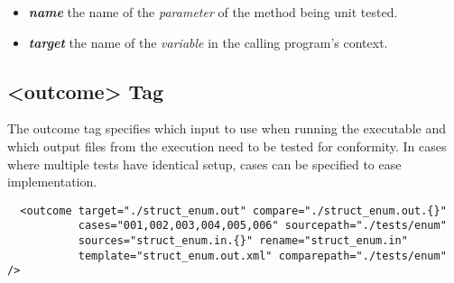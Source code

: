 \documentclass[paper=a4, fontsize=11pt]{scrartcl} %
\numberwithin{equation}{section} %
\numberwithin{figure}{section} %
\numberwithin{table}{section} %
\begin{document}
\begin{itemize}
\item \textbf{\textit{name}} the name of the \textit{parameter} of the method being unit tested.
\item \textbf{\textit{target}} the name of the \textit{variable} in the calling program's context.
\end{itemize}

\subsection{<outcome> Tag}

The outcome tag specifies which input to use when running the executable and which output files
from the execution need to be tested for conformity. In cases where multiple tests have identical
setup, cases can be specified to ease implementation.

\begin{lstlisting}
  <outcome target="./struct_enum.out" compare="./struct_enum.out.{}" 
           cases="001,002,003,004,005,006" sourcepath="./tests/enum" 
           sources="struct_enum.in.{}" rename="struct_enum.in" 
           template="struct_enum.out.xml" comparepath="./tests/enum" />
\end{lstlisting}
\end{document}
